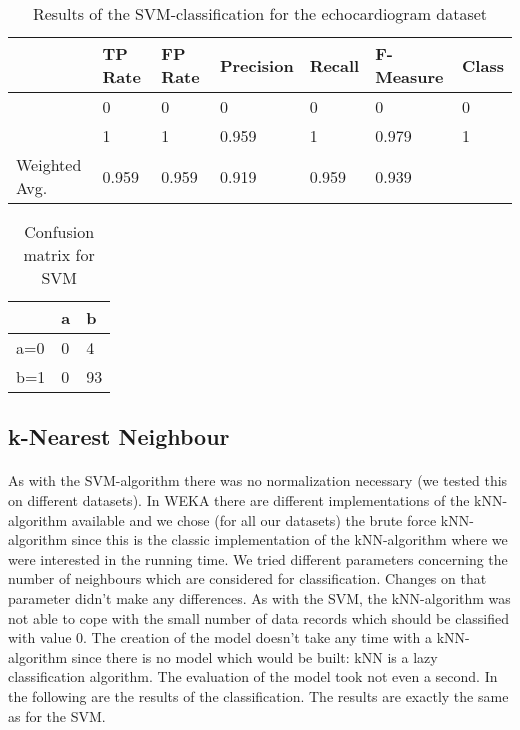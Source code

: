 \documentclass[paper=a4, fontsize=11pt]{scrartcl} %
\numberwithin{equation}{section} %
\numberwithin{figure}{section} %
\numberwithin{table}{section} %
\begin{document}
\begin{table}[h]
\centering
\begin{tabular}{lllllll}
	\toprule
									&TP Rate   	&FP Rate   &Precision   &Recall  &F-Measure   &Class\\
	\midrule
									&0         	&0         &0         	&0       &  0              &0\\
  								&1         	&1         &0.959     	&1       &0.979             &1\\
  
	Weighted Avg.		&0.959     	&0.959     &0.919   		&0.959   &0.939     		&\\
	\bottomrule
\end{tabular}
\caption{Results of the SVM-classification for the echocardiogram dataset}
\end{table}

\vspace{6pt}

\begin{table}[h]
\centering
\begin{tabular}{|l|ll|}
\hline
 & a &	b \\
\hline
a=0 & 0 & 4 \\
b=1 & 0 & 93\\
\hline
\end{tabular}
\caption{Confusion matrix for SVM}
\end{table}


\subsection{k-Nearest Neighbour}

\paragraph{}As with the SVM-algorithm there was no normalization necessary (we tested this on different datasets). In WEKA there are different implementations of the kNN-algorithm available and we chose (for all our datasets) the brute force kNN-algorithm since this is the classic implementation of the kNN-algorithm where we were interested in the running time. We tried different parameters concerning the number of neighbours which are considered for classification. Changes on that parameter didn't make any differences. As with the SVM, the kNN-algorithm was not able to cope with the small number of data records which should be classified with value 0. The creation of the model doesn't take any time with a kNN-algorithm since there is no model which would be built: kNN is a lazy classification algorithm. The evaluation of the model took not even a second. In the following are the results of the classification. The results are exactly the same as for the SVM.
\end{document}
